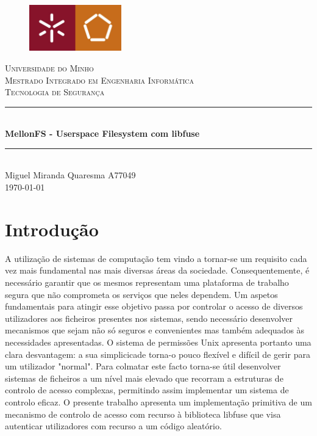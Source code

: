 \documentclass{article}
\newcommand{\titleRule}{
    \rule{\linewidth}{0.5mm} \\ [0.25cm]
}
\begin{document}
\begin{titlepage}
    \center
    \begin{figure}[H]
        \centering
        \includegraphics[width=4cm]{Pictures/UM_EENG.jpg}
    \end{figure}
    \textsc{\LARGE Universidade do Minho} \\ [1.5cm]
    \textsc{\Large Mestrado Integrado em Engenharia Informática} \\ [0.5cm]
    \textsc{\large Tecnologia de Segurança} \\ [0.5cm]

    \titleRule
    {\huge \bfseries MellonFS - Userspace Filesystem com libfuse}
    \titleRule

    Miguel Miranda Quaresma A77049 \\[0.25cm]

    \today
\end{titlepage}

\newpage

\tableofcontents

\newpage

\section{Introdução}
A utilização de sistemas de computação tem vindo a tornar-se um requisito cada vez mais fundamental nas mais diversas áreas da sociedade. Consequentemente, é necessário garantir que os mesmos representam uma plataforma de trabalho segura que não comprometa os serviços que neles dependem. Um aspetos fundamentais para atingir esse objetivo passa por controlar o acesso de diversos utilizadores aos ficheiros presentes nos sistemas, sendo necessário desenvolver mecanismos que sejam não só seguros e convenientes mas também adequados às necessidades apresentadas.
O sistema de permissões Unix apresenta portanto uma clara desvantagem: a sua simplicicade torna-o pouco flexível e difícil de gerir para um utilizador "normal". Para colmatar este facto torna-se útil desenvolver sistemas de ficheiros a um nível mais elevado que recorram a estruturas de controlo de acesso complexas, permitindo assim implementar um sistema de controlo eficaz. O presente trabalho apresenta um implementação primitiva de um mecanismo de controlo de acesso com recurso à biblioteca libfuse que visa autenticar utilizadores com recurso a um código aleatório.
\end{document}
